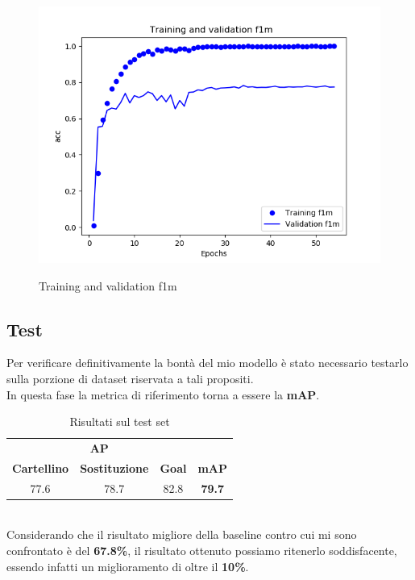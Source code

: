 \begin{figure}[H]
\centering
\caption{Training and validation f1m}
\includegraphics[width=\linewidth]{img/training-validation-f1m.png}
\label{figure : trainingvalf1}
\end{figure}
\subsection{Test}
Per verificare definitivamente la bontà del mio modello è stato necessario testarlo sulla porzione di dataset riservata a tali propositi. 
\\In questa fase la metrica di riferimento torna a essere la \textbf{mAP}.
\begin{table}[ht]
\label{table: test}
\caption{Risultati sul test set}
\centering
\begin{tabular}{c|c|c||c}
\multicolumn{3}{c}{\textbf{AP}}\\
\textbf{Cartellino} & \textbf{Sostituzione} & \textbf{Goal} & \textbf{mAP} \\
\hline
77.6& 78.7 & 82.8 & \textbf{79.7} \\ [1ex]
\end{tabular}
\end{table}
\\Considerando che il risultato migliore della baseline contro cui mi sono confrontato è del \textbf{67.8\%}, il 
risultato ottenuto possiamo ritenerlo soddisfacente, essendo infatti un miglioramento di oltre il \textbf{10\%}.